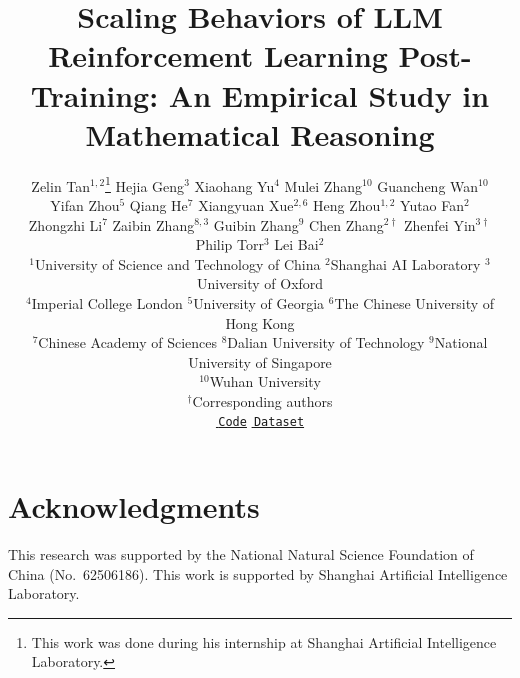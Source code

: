 \documentclass[11pt]{article}
\title{Scaling Behaviors of LLM Reinforcement Learning Post-Training: An Empirical Study in Mathematical Reasoning}
\author{
  \mdseries
  Zelin Tan$^{1,2}$\thanks{This work was done during his internship at Shanghai Artificial Intelligence Laboratory.} \quad
  Hejia Geng$^{3}$ \quad
  Xiaohang Yu$^{4}$ \quad
  Mulei Zhang$^{10}$ \quad
  Guancheng Wan$^{10}$ \\
  Yifan Zhou$^{5}$ \quad
  Qiang He$^{7}$ \quad
  Xiangyuan Xue$^{2,6}$ \quad
  Heng Zhou$^{1,2}$ \quad
  Yutao Fan$^{2}$ \\
  Zhongzhi Li$^{7}$ \quad
  Zaibin Zhang$^{8,3}$ \quad
  Guibin Zhang$^{9}$ \quad
  Chen Zhang$^{2\dagger}$ \quad
  Zhenfei Yin$^{3\dagger}$ \\
  Philip Torr$^{3}$ \quad
  Lei Bai$^{2}$ \\[6pt]
  $^{1}$University of Science and Technology of China \quad
  $^{2}$Shanghai AI Laboratory \quad
  $^{3}$University of Oxford \\
  $^{4}$Imperial College London \quad
  $^{5}$University of Georgia \quad
  $^{6}$The Chinese University of Hong Kong \\
  $^{7}$Chinese Academy of Sciences \quad
  $^{8}$Dalian University of Technology \quad
  $^{9}$National University of Singapore \\
  $^{10}$Wuhan University \\[4pt]
  {\small $^{\dagger}$Corresponding authors} \\[6pt]
  \href{https://github.com/tanzelin430/Mathematical-Reasoning-RL-Scaling-Law}{%
    \color{black}\faGithub\,\small\texttt{Code}}
  \quad
  \href{https://huggingface.co/datasets/Artemis0430/GURU-MATH-CL}{%
    \color{black}\hflogo\,\small\texttt{Dataset}}
}
\begin{document}
\maketitle









\section*{Acknowledgments}
This research was supported by the National Natural Science Foundation of China (No.\ 62506186). This work is supported by Shanghai Artificial Intelligence Laboratory.

%


\appendix
\label{sec:appendix}







\end{document}
